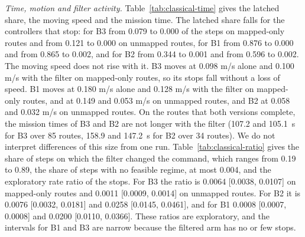 \emph{Time, motion and filter activity.} Table~\ref{tab:classical-time} gives the latched share, the moving speed and the mission time. The latched share falls for the controllers that stop: for B3 from 0.079 to 0.000 of the steps on mapped-only routes and from 0.121 to 0.000 on unmapped routes, for B1 from 0.876 to 0.000 and from 0.865 to 0.002, and for B2 from 0.344 to 0.001 and from 0.596 to 0.002. The moving speed does not rise with it. B3 moves at 0.098 m/s alone and 0.100 m/s with the filter on mapped-only routes, so its stops fall without a loss of speed. B1 moves at 0.180 m/s alone and 0.128 m/s with the filter on mapped-only routes, and at 0.149 and 0.053 m/s on unmapped routes, and B2 at 0.058 and 0.032 m/s on unmapped routes. On the routes that both versions complete, the mission times of B3 and B2 are not longer with the filter (107.2 and 105.1~s for B3 over 85 routes, 158.9 and 147.2~s for B2 over 34 routes). We do not interpret differences of this size from one run. Table~\ref{tab:classical-ratio} gives the share of steps on which the filter changed the command, which ranges from 0.19 to 0.89, the share of steps with no feasible regime, at most 0.004, and the exploratory rate ratio of the stops. For B3 the ratio is 0.0064 [0.0038, 0.0107] on mapped-only routes and 0.0011 [0.0009, 0.0014] on unmapped routes. For B2 it is 0.0076 [0.0032, 0.0181] and 0.0258 [0.0145, 0.0461], and for B1 0.0008 [0.0007, 0.0008] and 0.0200 [0.0110, 0.0366]. These ratios are exploratory, and the intervals for B1 and B3 are narrow because the filtered arm has no or few stops.

